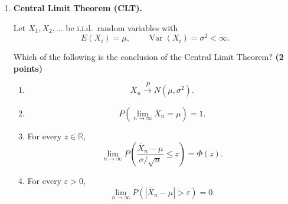 \documentclass[11pt]{article}
\begin{document}
\begin{enumerate}[label=(\alph*),leftmargin=*,itemsep=1.2em]
Let \(X_1,X_2,\ldots\) be i.i.d.\ random variables satisfying the same
assumptions as in the Weak Law of Large Numbers, with
\[
E(X_i)=\mu
\]
and finite variance
\[
\operatorname{Var}(X_i)=\sigma^2.
\]

Which of the following is the conclusion of the Strong Law of Large Numbers?
\hfill \textbf{(2 points)}

\begin{enumerate}[label=(\Alph*),leftmargin=2em,itemsep=0.5em]

    \item
    \[
    P\left(
    \lim_{n\to\infty}\overline X_n=\mu
    \right)=1.
    \]

    \item For every \(\varepsilon>0\),
    \[
    \lim_{n\to\infty}
    P\left(
    |\overline X_n-\mu|>\varepsilon
    \right)
    =0.
    \]

    \item
    \[
    \lim_{n\to\infty}
    P(\overline X_n=\mu)
    =1.
    \]

    \item
    \[
    \frac{\overline X_n-\mu}{\sigma/\sqrt n}
    \xrightarrow[]{d}
    N(0,1).
    \]

\end{enumerate}


\item \textbf{Central Limit Theorem (CLT).}

Let \(X_1,X_2,\ldots\) be i.i.d.\ random variables with
\[
E(X_i)=\mu,
\qquad
\operatorname{Var}(X_i)=\sigma^2<\infty.
\]

Which of the following is the conclusion of the Central Limit Theorem?
\hfill \textbf{(2 points)}

\begin{enumerate}[label=(\Alph*),leftmargin=2em,itemsep=0.5em]

    \item
    \[
    \overline X_n
    \xrightarrow[]{P}
    N(\mu,\sigma^2).
    \]

    \item
    \[
    P\left(
    \lim_{n\to\infty}\overline X_n=\mu
    \right)=1.
    \]

    \item For every \(z\in\mathbb R\),
    \[
    \lim_{n\to\infty}
    P\left(
    \frac{\overline X_n-\mu}{\sigma/\sqrt n}
    \leq z
    \right)
    =
    \Phi(z).
    \]

    \item For every \(\varepsilon>0\),
    \[
    \lim_{n\to\infty}
    P\left(
    |\overline X_n-\mu|>\varepsilon
    \right)
    =0.
    \]

\end{enumerate}

\end{enumerate}
\end{document}
